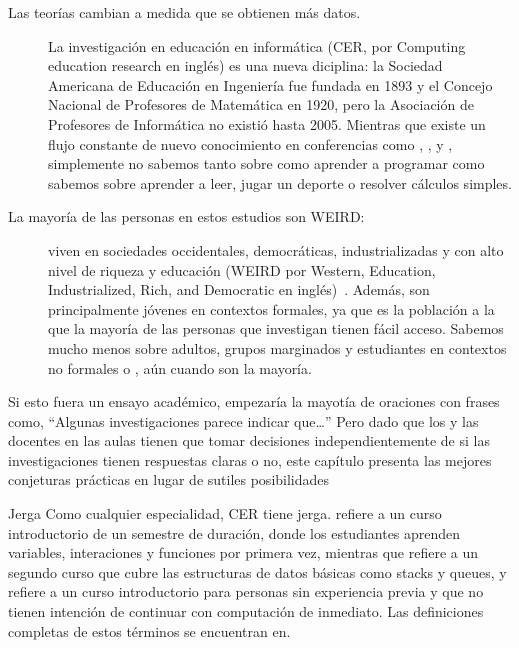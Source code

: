 \begin{description}

\item[Las teorías cambian a medida que se obtienen más datos.]
  La investigación en educación en informática (CER, por Computing education research en inglés) es una nueva diciplina:
  la Sociedad Americana de Educación en Ingeniería fue fundada en 1893 y el Concejo Nacional de Profesores de Matemática en 1920, pero la Asociación de Profesores de Informática no existió hasta 2005.
  Mientras que existe un flujo constante de nuevo conocimiento en conferencias como ,
  ,
  y ,
  simplemente no sabemos tanto sobre como aprender a programar como sabemos sobre aprender a leer, jugar un deporte o resolver cálculos simples.
  
\item[La mayoría de las personas en estos estudios son WEIRD:]
  viven en sociedades occidentales, democráticas, industrializadas y con alto nivel de riqueza y educación (WEIRD por Western, Education, Industrialized, Rich, and Democratic en inglés)~\cite{Henr2010}.
  Además,
  son principalmente jóvenes en contextos formales, ya que es la población a la que la mayoría de las personas que investigan tienen fácil acceso. 
  Sabemos mucho menos sobre adultos, grupos marginados y estudiantes en contextos no formales o ,
  aún cuando son la mayoría.

\end{description}

Si esto fuera un ensayo académico, empezaría la mayotía de oraciones con frases como,
``Algunas investigaciones parece indicar que{\ldots}''
Pero dado que los y las docentes en las aulas tienen que tomar decisiones independientemente de si las investigaciones tienen respuestas claras o no, este capítulo presenta las mejores conjeturas prácticas en lugar de sutiles posibilidades 

\begin{aside}{Jerga}
  Como cualquier especialidad,
  CER tiene jerga.
   refiere a un curso introductorio de un semestre de duración, donde los estudiantes aprenden variables, interaciones y funciones por primera vez, mientras que  refiere a un segundo curso que cubre las estructuras de datos básicas como  stacks y queues,
  y  refiere a un curso introductorio para personas sin experiencia previa y que no tienen intención de continuar con computación de inmediato.
  Las definiciones completas de estos términos se encuentran en.
\end{aside}

